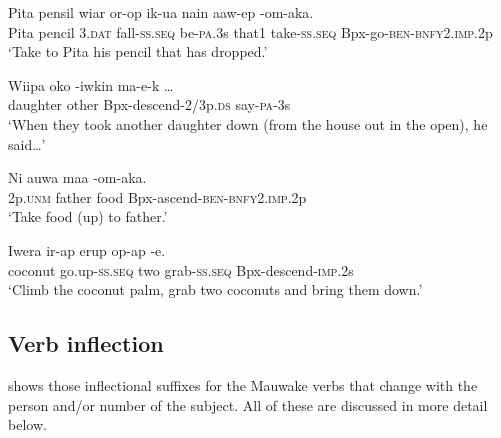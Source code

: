 \ea%
\label{ex:3:x430}
\gll Pita pensil wiar or-op ik-ua nain aaw-ep -om-aka.\\
Pita pencil 3.\textsc{dat} fall-\textsc{ss}.\textsc{seq} be-\textsc{pa}.3s that1 take-\textsc{ss}.\textsc{seq} Bpx-go-\textsc{ben}-\textsc{bnfy}2.\textsc{imp}.2p\\
\glt`Take to Pita his pencil that has dropped.'
\z

\ea%
\label{ex:3:x222}
\gll Wiipa oko -iwkin ma-e-k {\dots} \\
daughter other Bpx-descend-2/3p.\textsc{ds} say-\textsc{pa}-3s \\
\glt`When they took another daughter down (from the house out in the open), he said{\dots}' 
\z

\ea%
\label{ex:3:x223}
\gll Ni auwa maa -om-aka. \\
2p.\textsc{unm} father food Bpx-ascend-\textsc{ben}-\textsc{bnfy}2.\textsc{imp}.2p \\
\glt`Take food (up) to father.'
\z

\ea%
\label{ex:3:x224}
\gll Iwera ir-ap erup op-ap -e. \\
coconut go.up-\textsc{ss}.\textsc{seq} two grab-\textsc{ss}.\textsc{seq} Bpx-descend-\textsc{imp}.2s \\
\glt`Climb the coconut palm, grab two coconuts and bring them down.' 
\z

\subsection{Verb inflection} 
{}
 shows those inflectional suffixes for the Mauwake verbs that change with the person and/or number of the subject. All of these are discussed in more detail below.

